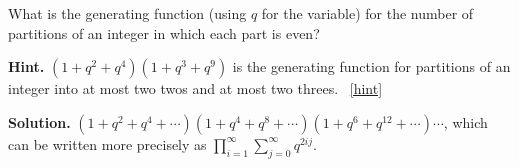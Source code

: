 \documentclass{book}
\begin{document}
\setcounter{project}{321}
\addtocounter{project}{-1}
\begin{activity}[]\label{activity-314}
\hypertarget{p-1636}{}%
What is the generating function (using \(q\) for the variable) for the number of partitions of an integer in which each part is even?%
\par\smallskip%
\noindent\textbf{Hint.}\hypertarget{hint-212}{}\quad%
\hypertarget{p-1637}{}%
\((1 + q^2 + q^4 )(1 + q^3 + q^9 )\) is the generating function for partitions of an integer into at most two twos and at most two threes.%
~\hfill{\tiny\hyperlink{a-321}{[hint]}\hypertarget{q-321}{}}\par\smallskip%
\noindent\textbf{Solution.}\hypertarget{solution-239}{}\quad%
\hypertarget{p-1638}{}%
\((1+q^2+q^4+\cdots)(1+q^4+q^8+\cdots)(1+q^6+q^{12}+\cdots)\cdots\), which can be written more precisely as \(\displaystyle\prod_{i=1}^\infty
\sum_{j=0}^\infty q^{2ij}\).%
\end{activity}
\end{document}
